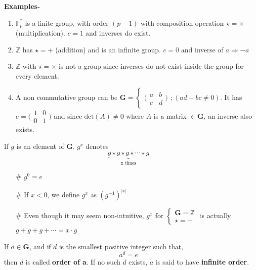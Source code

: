 \begin{mdframed}
			\textbf{Examples-}
			\begin{enumerate}
				\item \(\mathbb{F}_p^*\) is a finite group, with order \((p-1)\) with composition operation \(\star = \times\) (multiplication). \(e=1\) and inverses do exist.
				\item \(\mathbb{Z}\) has \(\star = +\) (addition) and is an infinite group. \(e = 0\) and inverse of \(a \Rightarrow -a\)
				\item \(\mathbb{Z}\) with \(\star = \times\) is not a group since inverses do not exist inside the group for every element.
				\item A non commutative group can be \(\mathbf{G} = \begin{cases}\big(\begin{smallmatrix}
				  a & b\\ 
				  c & d
				\end{smallmatrix}\big)\end{cases} ; (ad-bc \not = 0)\). It has \(e = \big(\begin{smallmatrix}
				  1 & 0\\ 
				  0 & 1
				\end{smallmatrix}\big)\) and since \(\text{det}(A) \not = 0\) where \(A \) is a matrix \(\in \mathbf{G}\), an inverse also exists.
			\end{enumerate}

			If \(g\) is an element of \(\mathbf{G}\), \(g^x\) denotes \[\underbrace{g\star g\star g\star \cdots \star g}_{\text{x times}}\]
			\begin{itemize}
				\item[\(\#\)] \(g^0 = e\)
				\item[\(\#\)] If \(x<0\), we define \(g^x\) as \((g^{-1})^{|x|}\)
				\item[\(\#\)] Even though it may seem non-intuitive, \(g^x\) for \(\begin{cases}\mathbf{G}= \mathbb{Z}\\ \star=+ \end{cases}\) is actually \(g+ g+ g+ \cdots=x\cdot g\)
			\end{itemize}

			\begin{mybox}
				If \(a\in \mathbf{G}\), and if \(d\) is the smallest positive integer such that, \[a^d=e\] then \(d\) is called \textbf{order of a}. If no such \(d\) exists, \(a\) is said to have \textbf{infinite order}.
			\end{mybox}


\end{mdframed}
